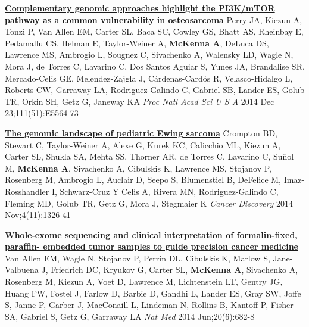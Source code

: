 \documentclass[9pt]{article}
\begin{document}
\noindent\href{https://www.ncbi.nlm.nih.gov/pubmed/25512523}{\bf  Complementary genomic approaches highlight the PI3K/mTOR pathway as a common vulnerability in osteosarcoma}\vspace{-0.03in}
\newline\noindent Perry JA, Kiezun A, Tonzi P, Van Allen EM, Carter SL, Baca SC, Cowley GS, Bhatt AS, Rheinbay E, Pedamallu CS, Helman E, Taylor-Weiner A, \textbf{McKenna A}, DeLuca  DS, Lawrence MS, Ambrogio L, Sougnez C, Sivachenko A, Walensky LD, Wagle N, Mora  J, de Torres C, Lavarino C, Dos Santos Aguiar S, Yunes JA, Brandalise SR, Mercado-Celis GE, Melendez-Zajgla J, Cárdenas-Cardós R, Velasco-Hidalgo L, Roberts CW, Garraway LA, Rodriguez-Galindo C, Gabriel SB, Lander ES, Golub TR, Orkin SH, Getz G, Janeway KA
\newline\noindent\emph{ Proc Natl Acad Sci U S A} 2014 Dec 23;111(51):E5564-73
\bigskip

\noindent\href{https://www.ncbi.nlm.nih.gov/pubmed/25186949}{\bf  The genomic landscape of pediatric Ewing sarcoma}\vspace{-0.03in}
\newline\noindent Crompton BD, Stewart C, Taylor-Weiner A, Alexe G, Kurek KC, Calicchio ML, Kiezun A, Carter SL, Shukla SA, Mehta SS, Thorner AR, de Torres C, Lavarino C, Suñol M, \textbf{McKenna A}, Sivachenko A, Cibulskis K, Lawrence MS, Stojanov P, Rosenberg M, Ambrogio L, Auclair D, Seepo S, Blumenstiel B, DeFelice M, Imaz-Rosshandler I, Schwarz-Cruz Y Celis A, Rivera MN, Rodriguez-Galindo C, Fleming MD, Golub TR, Getz G, Mora J, Stegmaier K
\newline\noindent\emph{ Cancer Discovery} 2014 Nov;4(11):1326-41
\bigskip

\noindent\href{https://www.ncbi.nlm.nih.gov/pubmed/24836576}{\bf  Whole-exome sequencing and clinical interpretation of formalin-fixed, paraffin- embedded tumor samples to guide precision cancer medicine}\vspace{-0.03in}
\newline\noindent Van Allen EM, Wagle N, Stojanov P, Perrin DL, Cibulskis K, Marlow S, Jane-Valbuena J, Friedrich DC, Kryukov G, Carter SL, \textbf{McKenna A}, Sivachenko A, Rosenberg M, Kiezun A, Voet D, Lawrence M, Lichtenstein LT, Gentry JG, Huang FW,  Fostel J, Farlow D, Barbie D, Gandhi L, Lander ES, Gray SW, Joffe S, Janne P, Garber J, MacConaill L, Lindeman N, Rollins B, Kantoff P, Fisher SA, Gabriel S, Getz G, Garraway LA
\newline\noindent\emph{ Nat Med} 2014 Jun;20(6):682-8
\bigskip
\end{document}
